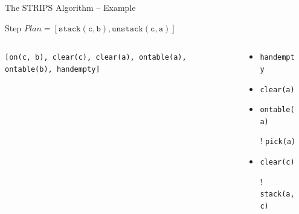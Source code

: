 \documentclass[presentation]{beamer}\mode<presentation>{\usetheme{AMSBolognaFC}}
\begin{document}
\begin{frame}[c]{The STRIPS Algorithm -- Example}
\small

\begin{exampleblock}{Step \nextStripsExampleStep{} \hfill $Plan = [\mathtt{stack(c,b),unstack(c,a)}]$}
	\begin{columns}[t]
		\begin{column}{.30\linewidth}\centering
			\texttt{[on(c, b), clear(c), clear(a), ontable(a), ontable(b), \alert{handempty}]}
		\end{column}
		\begin{column}{.50\linewidth}\centering
			\begin{itemize}
			    \item \alert{\texttt{handempty}}
			    \item \texttt{clear(a)}
				\item \texttt{ontable(a)}
				\item[!] \texttt{pick(a)}
				\item \texttt{clear(c)}
				\item[!] \texttt{stack(a,c)}
			\end{itemize}
		\end{column}
		\begin{column}{.10\linewidth}\centering
			
		\end{column}
	\end{columns}
\end{exampleblock}

\end{frame}
\end{document}

